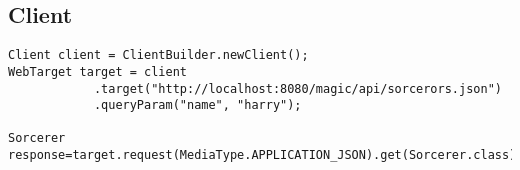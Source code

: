 \subsection{Client}

\begin{verbatim}
Client client = ClientBuilder.newClient();
WebTarget target = client
			.target("http://localhost:8080/magic/api/sorcerors.json")
			.queryParam("name", "harry");

Sorcerer response=target.request(MediaType.APPLICATION_JSON).get(Sorcerer.class);
\end{verbatim}

\begin{verbatim}

\end{verbatim}

